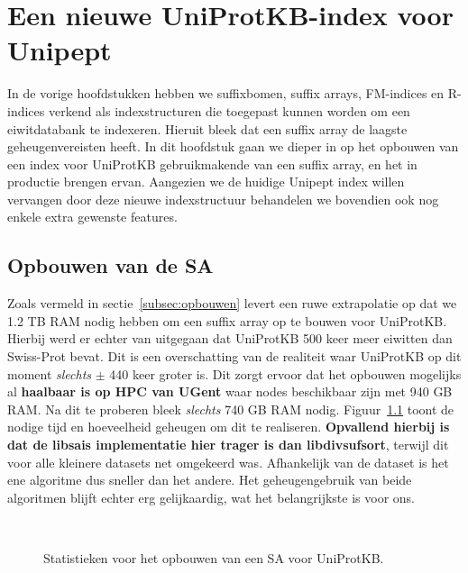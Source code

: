 \chapter{Een nieuwe UniProtKB-index voor Unipept}\label{ch:een-nieuwe-uniprotkb-index-voor-unipept}
In de vorige hoofdstukken hebben we suffixbomen, suffix arrays, FM-indices en R-indices verkend als indexstructuren die toegepast kunnen worden om een eiwitdatabank te indexeren.
Hieruit bleek dat een suffix array de laagste geheugenvereisten heeft.
In dit hoofdstuk gaan we dieper in op het opbouwen van een index voor UniProtKB gebruikmakende van een suffix array, en het in productie brengen ervan.
Aangezien we de huidige Unipept index willen vervangen door deze nieuwe indexstructuur behandelen we bovendien ook nog enkele extra gewenste features.

\section{Opbouwen van de SA}\label{sec:opbouwen-van-de-sa}
Zoals vermeld in sectie~\ref{subsec:opbouwen} levert een ruwe extrapolatie op dat we 1.2 TB RAM nodig hebben om een suffix array op te bouwen voor UniProtKB\@.
Hierbij werd er echter van uitgegaan dat UniProtKB 500 keer meer eiwitten dan Swiss-Prot bevat.
Dit is een overschatting van de realiteit waar UniProtKB op dit moment \textit{slechts} $\pm$ 440 keer groter is.
Dit zorgt ervoor dat het opbouwen mogelijks al \textbf{haalbaar is op HPC van UGent} waar nodes beschikbaar zijn met 940 GB RAM\@.
Na dit te proberen bleek \textit{slechts} 740 GB RAM nodig.
Figuur~\ref{fig:build_uniprot} toont de nodige tijd en hoeveelheid geheugen om dit te realiseren.
\textbf{Opvallend hierbij is dat de libsais implementatie hier trager is dan libdivsufsort}, terwijl dit voor alle kleinere datasets net omgekeerd was.
Afhankelijk van de dataset is het ene algoritme dus sneller dan het andere.
Het geheugengebruik van beide algoritmen blijft echter erg gelijkaardig, wat het belangrijkste is voor ons.
\\
\begin{figure}[H]
    \centering
    \\[4ex] %

    \caption{Statistieken voor het opbouwen van een SA voor UniProtKB.}\label{fig:build_uniprot}
\end{figure}

